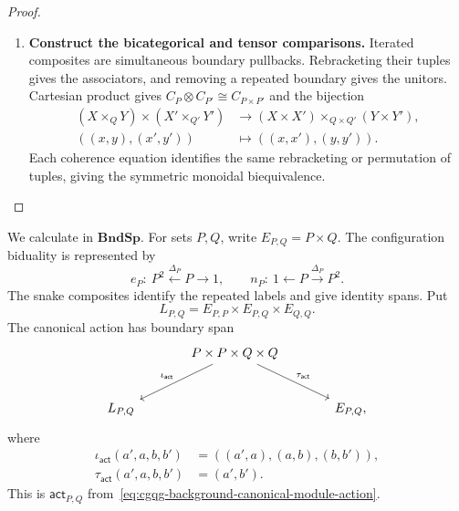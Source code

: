 \documentclass[oneside]{article}
\newcommand{\act}{\mathsf{act}}
\theoremstyle{plain}
\theoremstyle{definition}
\theoremstyle{remark}
\begin{document}
\begin{proof}
\begin{enumerate}[beginpenalty=10000]
        \item \textbf{Construct the bicategorical and tensor comparisons.}
        Iterated composites are simultaneous boundary pullbacks.
        Rebracketing their tuples gives the associators, and removing a
        repeated boundary gives the unitors. Cartesian product gives
        \(C_P\otimes C_{P'}\cong C_{P\times P'}\) and the bijection
        \[
        \begin{aligned}
        (X\times_QY)\times(X'\times_{Q'}Y')
          &\longrightarrow
          (X\times X')\times_{Q\times Q'}(Y\times Y'),\\
        ((x,y),(x',y'))&\longmapsto((x,x'),(y,y')).
        \end{aligned}
        \]
        Each coherence equation identifies the same rebracketing or
        permutation of tuples, giving the symmetric monoidal biequivalence.
        \qedhere
    \end{enumerate}
\end{proof}

We calculate in \(\mathbf{BndSp}\). For sets \(P,Q\), write
\(E_{P,Q}=P\times Q\). The configuration biduality is represented by
\[
 e_P:\ P^2\xleftarrow{\Delta_P}P\longrightarrow1,
 \qquad
 n_P:\ 1\longleftarrow P\xrightarrow{\Delta_P}P^2.
\]
The snake composites identify the repeated labels and give identity spans.
Put
\[
 L_{P,Q}=E_{P,P}\times E_{P,Q}\times E_{Q,Q}.
\]
The canonical action has boundary span
\[
 \begin{tikzcd}[column sep=large,row sep=large]
 &P\times P\times Q\times Q
   \arrow[dl,"\iota_{\act}"']\arrow[dr,"\tau_{\act}"]&\\
 L_{P,Q}&&E_{P,Q},
 \end{tikzcd}
\]
where
\begin{align}
 \iota_{\act}(a',a,b,b')&=((a',a),(a,b),(b,b')),\\
 \tau_{\act}(a',a,b,b')&=(a',b').
 \label{eq:cgqg-bndsp-canonical-action}
\end{align}
This is \(\act_{P,Q}\) from~\eqref{eq:cgqg-background-canonical-module-action}.
\end{document}

